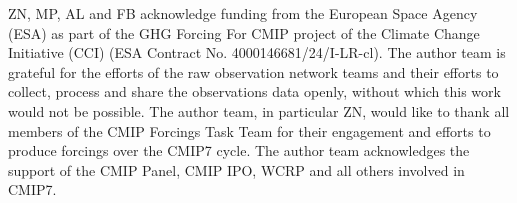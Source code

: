 ZN, MP, AL and FB acknowledge funding from the European Space Agency (ESA) as part of the GHG Forcing For CMIP project of the Climate Change Initiative (CCI) (ESA Contract No. 4000146681/24/I-LR-cl).
The author team is grateful for the efforts of the raw observation network teams and their efforts to collect, process and share the observations data openly, without which this work would not be possible.
The author team, in particular ZN, would like to thank all members of the CMIP Forcings Task Team for their engagement and efforts to produce forcings over the CMIP7 cycle.
The author team acknowledges the support of the CMIP Panel, CMIP IPO, WCRP and all others involved in CMIP7.
